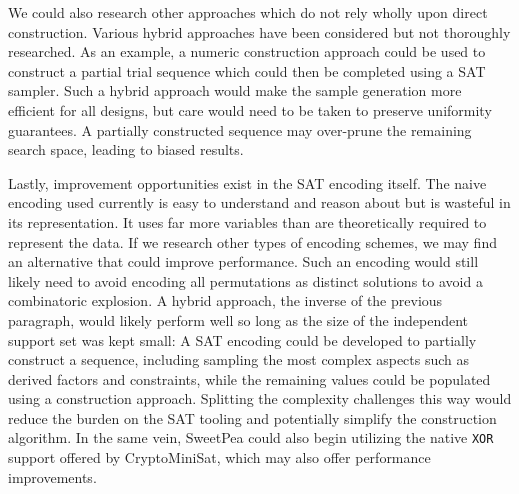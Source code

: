 We could also research other approaches which do not rely wholly upon direct construction. Various hybrid approaches have been considered but not thoroughly researched. As an example, a numeric construction approach could be used to construct a partial trial sequence which could then be completed using a SAT sampler. Such a hybrid approach would make the sample generation more efficient for all designs, but care would need to be taken to preserve uniformity guarantees. A partially constructed sequence may over-prune the remaining search space, leading to biased results.

Lastly, improvement opportunities exist in the SAT encoding itself. The naive encoding used currently is easy to understand and reason about but is wasteful in its representation. It uses far more variables than are theoretically required to represent the data. If we research other types of encoding schemes, we may find an alternative that could improve performance. Such an encoding would still likely need to avoid encoding all permutations as distinct solutions to avoid a combinatoric explosion. A hybrid approach, the inverse of the previous paragraph, would likely perform well so long as the size of the independent support set was kept small: A SAT encoding could be developed to partially construct a sequence, including sampling the most complex aspects such as derived factors and constraints, while the remaining values could be populated using a construction approach. Splitting the complexity challenges this way would reduce the burden on the SAT tooling and potentially simplify the construction algorithm. In the same vein, SweetPea could also begin utilizing the native \texttt{XOR} support offered by CryptoMiniSat, which may also offer performance improvements.
